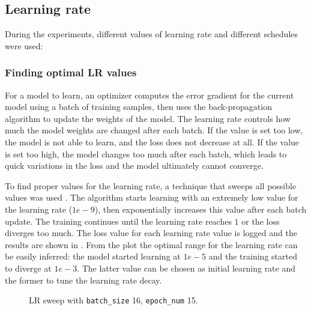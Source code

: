 \subsection{Learning rate}

During the experiments, different values of learning rate and different
schedules were used:

\subsubsection{Finding optimal LR values}
\label{sec:lr_sweep}

For a model to learn, an optimizer computes the error gradient for the current
model using a batch of training samples, then uses the back-propagation
algorithm to update the weights of the model.
The learning rate controls how much the model weights are changed after each batch.
If the value is set too low, the model is not able to learn, and the loss does
not decrease at all.
If the value is set too high, the model changes too much after each batch,
which leads to quick variations in the loss and the model ultimately cannot
converge.

To find proper values for the learning rate, a technique that sweeps all
possible values was used \cite{PYISlearningsweep}.
The algorithm starts learning with an extremely low value for the learning rate
($1e-9$), then exponentially increases this value after each batch update. The
training continues until the learning rate reaches $1$ or the loss diverges too
much.
The loss value for each learning rate value is logged and the results are shown
in .
From the plot the optimal range for the learning rate can be easily inferred:
the model started learning at $1e-5$ and the training started to diverge at
$1e-3$. The latter value can be chosen as initial learning rate and the former
to tune the learning rate decay.

\begin{figure}[t!]
    \centering
    \caption{LR sweep with \texttt{batch\_size} 16, \texttt{epoch\_num} 15.}%
    \label{fig:LR_sweep_bs16_en15}
\end{figure}

